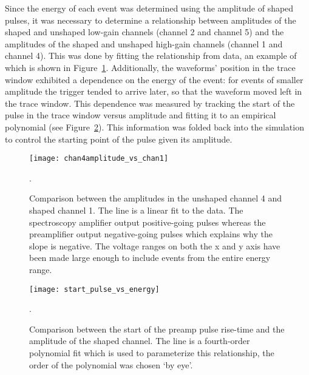 	Since the energy of each event was determined using the amplitude of shaped pulses, it was necessary to determine a relationship between amplitudes of the shaped and unshaped low-gain channels (channel 2 and channel 5) and the amplitudes of the shaped and unshaped high-gain channels (channel 1 and channel 4).  This was done by fitting the relationship from data, an example of which is shown in Figure~\ref{fig:Risetimechan2vschan4}.  Additionally, the waveforms' position in the trace window exhibited a dependence on the energy of the event: for events of smaller amplitude the trigger tended to arrive later, so that the waveform moved left in the trace window.  This dependence was measured by tracking the start of the pulse in the trace window versus amplitude and fitting it to an empirical polynomial (see Figure~\ref{fig:TriggerPositionDependence}).  This information was folded back into the simulation to control the starting point of the pulse given its amplitude.
	
					\begin{figure}
						\centering
						\texttt{[image: chan4amplitude\_vs\_chan1]}
						\caption[Unshaped amplitudes vs.~shaped amplitudes in the \bege]
						{Comparison between the amplitudes in the unshaped channel 4 and shaped channel 1.  											The line is a linear fit to the data.  The spectroscopy amplifier
						output positive-going pulses whereas the preamplifier output negative-going pulses which explains why the slope 
						is negative.  The voltage ranges on both the x and y axis have been made large enough to include events from the
						entire energy range.}
						\label{fig:Risetimechan2vschan4}.
					\end{figure}
					
					\begin{figure}
						\centering
						\texttt{[image: start\_pulse\_vs\_energy]}
						\caption[Start of the preamp pulse versus the amplitude of the shaped channel]
						{Comparison between the start of the preamp pulse rise-time and the amplitude of the shaped
						 channel.  The line is a fourth-order polynomial fit which is used to parameterize this relationship, the order
						 of the polynomial was chosen `by eye'.}
						\label{fig:TriggerPositionDependence}.
					\end{figure}					
	
